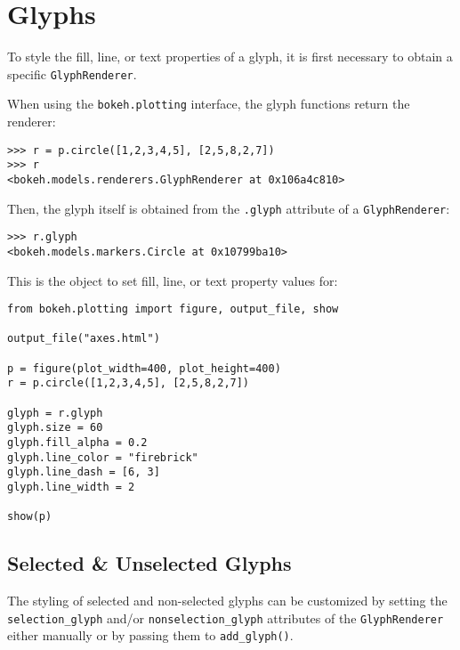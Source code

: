 \documentclass[a4paper,12pt]{article}
\begin{document}
	\large

\section{Glyphs}
To style the fill, line, or text properties of a glyph, it is first necessary to obtain a specific \texttt{GlyphRenderer}. 

When using the \texttt{bokeh.plotting} interface, the glyph functions return the renderer:

\begin{framed}
\begin{verbatim}
>>> r = p.circle([1,2,3,4,5], [2,5,8,2,7])
>>> r
<bokeh.models.renderers.GlyphRenderer at 0x106a4c810>
\end{verbatim}
\end{framed}



Then, the glyph itself is obtained from the \texttt{.glyph} attribute of a \texttt{GlyphRenderer}:

\begin{framed}
	\begin{verbatim}
>>> r.glyph
<bokeh.models.markers.Circle at 0x10799ba10>
\end{verbatim}
\end{framed}
This is the object to set fill, line, or text property values for:

\begin{framed}
\begin{verbatim}
from bokeh.plotting import figure, output_file, show

output_file("axes.html")

p = figure(plot_width=400, plot_height=400)
r = p.circle([1,2,3,4,5], [2,5,8,2,7])

glyph = r.glyph
glyph.size = 60
glyph.fill_alpha = 0.2
glyph.line_color = "firebrick"
glyph.line_dash = [6, 3]
glyph.line_width = 2

show(p)
\end{verbatim}
\end{framed}
\subsection{Selected \& Unselected Glyphs}
The styling of selected and non-selected glyphs can be customized by setting the \texttt{selection\_glyph} and/or \texttt{nonselection\_glyph} attributes of the \texttt{GlyphRenderer} either manually or by passing them to \texttt{add\_glyph()}.
\end{document}
